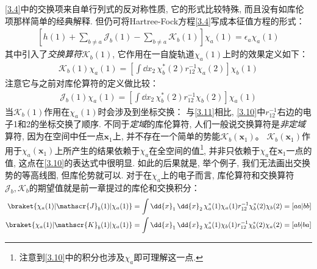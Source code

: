 \autoref{3.4}中的交换项来自单行列式的反对称性质, 它的形式比较特殊, 而且没有如库伦项那样简单的经典解释. 
但仍可将Hartree-Fock方程\autoref{3.4}写成本征值方程的形式：
\begin{align}
	\left[ h(1) + \sum_{b\neq a}\mathscr{J}_b(1) - \sum_{b\neq a}\mathscr{K}_b(1)   \right]\chi_a(1) = \epsilon_a\chi_a(1)
\end{align}
其中引入了\emph{交换算符}$\mathscr{K}_b(1)$, 
它作用在一自旋轨道$\chi_a(1)$上时的效果定义如下：
\begin{align}
	\label{3.10}
	\mathscr{K}_b(1)\chi_a(1) = \left[ \int\dd{x}_2\,\chi_b^*(2)r_{12}^{-1}\chi_a(2) \right]\chi_b(1)
\end{align}
注意它与之前对库伦算符的定义做比较：
\begin{align}
	\label{3.11}
	\mathscr{J}_b(1)\chi_a(1) = \left[ \int\dd{x}_2\,\chi_b^*(2)r_{12}^{-1}\chi_b(2) \right]\chi_a(1)
\end{align}
当$\mathscr{K}_b(1)$作用在$\chi_a(1)$时会涉及到坐标交换：
与\autoref{3.11}相比, \autoref{3.10}中$r_{12}^{-1}$右边的电子1和2的坐标交换了顺序. 
不同于\emph{定域}的库伦算符, 人们一般说交换算符是\emph{非定域}算符, 
因为在空间中任一点$\mathbf{x}_1$上, 并不存在一个简单的势能$\mathscr{K}_b(\mathbf{x}_1)$。 $\mathscr{K}_b(\mathbf{x}_1)$作用于$\chi_a(\mathbf{x}_1)$上所产生的结果依赖于$\chi_a$在全空间的值\footnote{
	注意到\autoref{3.10}中的积分也涉及$\chi_a$即可理解这一点.
}, 
并非只依赖于$\chi_a$在$\mathbf{x}_1$一点的值, 这点在\autoref{3.10}的表达式中很明显. 
如此的后果就是, 举个例子, 我们无法画出交换势的等高线图, 但库伦势就可以. 
对于在$\chi_a$上的电子而言, 库伦算符和交换算符$\mathscr{J}_b,\mathscr{K}_b$的期望值就是前一章提过的库伦和交换积分：
\begin{align}
	\label{3.12}
	\braket{\chi_a(1)|\mathscr{J}_b(1)|\chi_a(1)} & = \int\dd{x}_1\,\dd{x}_2\,\chi_a^*(1)\chi_a(1)r_{12}^{-1}\chi_b^*(2)\chi_b(2) = [aa|bb]\\
	\braket{\chi_a(1)|\mathscr{K}_b(1)|\chi_a(1)} & = \int\dd{x}_1\,\dd{x}_2\,\chi_a^*(1)\chi_b(1)r_{12}^{-1}\chi_b^*(2)\chi_a(2) = [ab|ba]
\end{align}

